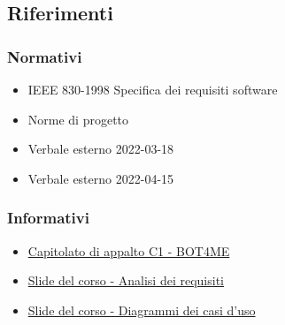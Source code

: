 \subsection{Riferimenti}

\subsubsection{Normativi}
\begin{itemize}
    \item IEEE 830-1998 Specifica dei requisiti software
    \item Norme di progetto {\docVersionNdP}
    \item Verbale esterno 2022-03-18
    \item Verbale esterno 2022-04-15
\end{itemize}

\subsubsection{Informativi}
\begin{itemize}
    \item \href{https://www.math.unipd.it/~tullio/IS-1/2021/Progetto/C1.pdf}{\color{blue} Capitolato di appalto C1 - BOT4ME}
    \item \href{https://www.math.unipd.it/~tullio/IS-1/2021/Dispense/T07.pdf}{\color{blue} Slide del corso - Analisi dei requisiti}
    \item \href{https://www.math.unipd.it/~rcardin/swea/2022/Diagrammi%20Use%20Case.pdf}{\color{blue} Slide del corso - Diagrammi dei casi d'uso}
\end{itemize}
\newpage